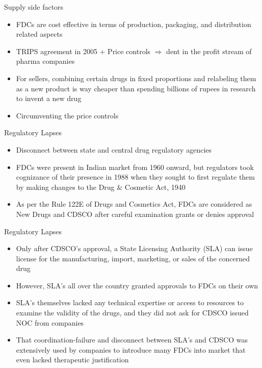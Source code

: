 \documentclass[aspectratio=43]{beamer}
\begin{document}
\begin{frame}{Supply side factors}
	\begin{itemize}
		\item FDCs are cost effective in terms of production, packaging, and distribution related aspects
		\pause
		\medskip
		\item TRIPS agreement in 2005 + Price controls \pause  $\boldsymbol{\Rightarrow}$ dent in the profit stream of pharma companies 
		\medskip
		\pause
		\item For sellers, combining certain drugs in fixed proportions and relabeling them as a new product is way cheaper than spending billions of rupees in research to invent a new drug 
		\pause
		\medskip
		\item Circumventing the price controls
	\end{itemize}
\end{frame}

\begin{frame}{Regulatory Lapses}
	\begin{itemize}
		\item Disconnect between state and central drug regulatory agencies
		\medskip
		\pause
		\item FDCs were present in Indian market from 1960 onward, but regulators took cognizance of their presence in 1988 when they sought to first regulate them by making changes to the Drug \& Cosmetic Act, 1940
		\medskip
		\pause
		\item As per the Rule 122E of Drugs and Cosmetics Act, FDCs are considered as New Drugs and CDSCO after careful examination grants or denies approval
	\end{itemize}
\end{frame}


\begin{frame}{Regulatory Lapses}
	\begin{itemize}
		\item Only after CDSCO’s approval, a State Licensing Authority (SLA) can issue license for the manufacturing, import, marketing, or sales of the concerned drug
		\medskip
		\pause
		\item However, SLA’s all over the country granted approvals to FDCs on their own
		\medskip
		\pause
		\item SLA’s themselves lacked any technical expertise or access to resources to examine the validity of the drugs, and they did not ask for CDSCO issued NOC from companies
		\medskip
		\pause
		\item That coordination-failure and disconnect between SLA’s and CDSCO was extensively used by companies to introduce many FDCs into market that even lacked therapeutic justification

	\end{itemize}
\end{frame}
\end{document}

